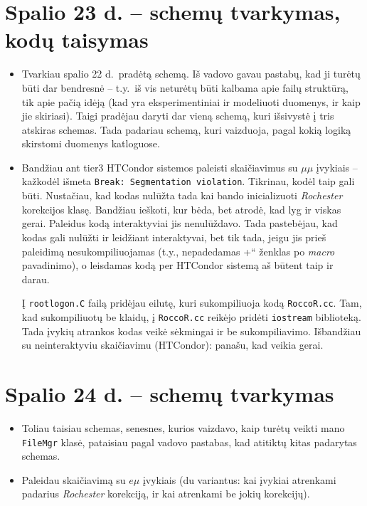\documentclass[a4paper, 12pt]{article}
\newcommand{\ltq}[1]{{\quotedblbase{}#1\textquotedblleft{}}}
\newcommand{\ttt}[1]{\texttt{#1}}
\begin{document}
\section{Spalio 23 d. -- schemų tvarkymas, kodų taisymas}
\begin{itemize}
	\item Tvarkiau spalio 22 d.\ pradėtą schemą. Iš vadovo gavau pastabų, kad ji
	turėtų būti dar bendresnė -- t.y.\ iš vis neturėtų būti kalbama apie failų
	struktūrą, tik apie pačią idėją (kad yra eksperimentiniai ir modeliuoti duomenys,
	ir kaip jie skiriasi). Taigi pradėjau daryti dar vieną schemą, kuri išsivystė į tris
	atskiras schemas. Tada padariau schemą, kuri vaizduoja, pagal kokią logiką skirstomi
	duomenys katloguose.
	
	\item Bandžiau ant tier3 HTCondor sistemos paleisti skaičiavimus su $\mu\mu$ 
	įvykiais -- kažkodėl išmeta \ttt{Break: Segmentation violation}. Tikrinau, kodėl
	taip gali būti. Nustačiau, kad kodas nulūžta tada kai bando inicializuoti
	\textit{Rochester} korekcijos klasę. Bandžiau ieškoti, kur bėda, bet atrodė, kad
	lyg ir viskas gerai. Paleidus kodą interaktyviai jis nenulūždavo. Tada pastebėjau,
	kad kodas gali nulūžti ir leidžiant interaktyvai, bet tik tada, jeigu jis prieš
	paleidimą nesukompiliuojamas (t.y., nepadedamas \ltq{+} ženklas po \textit{macro}
	pavadinimo), o leisdamas kodą per HTCondor sistemą aš būtent taip ir darau.
	
	Į \ttt{rootlogon.C} failą pridėjau eilutę, kuri sukompiliuoja kodą \ttt{RoccoR.cc}.
	Tam, kad sukompiliuotų be klaidų, į \ttt{RoccoR.cc} reikėjo pridėti \ttt{iostream}
	biblioteką. Tada įvykių atrankos kodas veikė sėkmingai ir be sukompiliavimo. Išbandžiau
	su neinteraktyviu skaičiavimu (HTCondor): panašu, kad veikia gerai.
\end{itemize}

\section{Spalio 24 d. -- schemų tvarkymas}
\begin{itemize}
	\item Toliau taisiau schemas, senesnes, kurios vaizdavo, kaip turėtų veikti mano
	\ttt{FileMgr} klasė, pataisiau pagal vadovo pastabas, kad atitiktų kitas padarytas schemas.
	\item Paleidau skaičiavimą su $e\mu$ įvykiais (du variantus: kai įvykiai atrenkami padarius
	\textit{Rochester} korekciją, ir kai atrenkami be jokių korekcijų).
\end{itemize}
\end{document}
